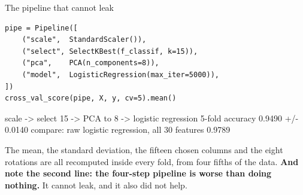 \documentclass[aspectratio=169]{beamer}
\begin{document}
\begin{frame}[fragile,shrink=4]{The pipeline that cannot leak}
\begin{lstlisting}
pipe = Pipeline([
    ("scale",  StandardScaler()),
    ("select", SelectKBest(f_classif, k=15)),
    ("pca",    PCA(n_components=8)),
    ("model",  LogisticRegression(max_iter=5000)),
])
cross_val_score(pipe, X, y, cv=5).mean()
\end{lstlisting}
\begin{outblk}
scale -> select 15 -> PCA to 8 -> logistic regression
   5-fold accuracy 0.9490  +/- 0.0140
   compare: raw logistic regression, all 30 features 0.9789
\end{outblk}
\begin{center}\small
  The mean, the standard deviation, the fifteen chosen columns and the eight
  rotations are all recomputed inside every fold, from four fifths of the
  data. \textbf{And note the second line: the four-step pipeline is worse
  than doing nothing.} It cannot leak, and it also did not help.
\end{center}
\end{frame}
\end{document}

